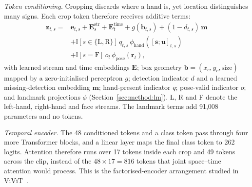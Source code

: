 \documentclass[pdflatex,sn-mathphys-num,twocolumn]{sn-jnl}
\theoremstyle{thmstyleone}%
\begin{document}
\textit{Token conditioning.} Cropping discards where a hand is, yet location distinguishes many signs. Each crop token therefore receives additive terms:
\begin{equation}
\begin{aligned}
\mathbf{z}_{t,s}={}&\mathbf{e}_{t,s}+\mathbf{E}^{\mathrm{str}}_{s}+\mathbf{E}^{\mathrm{time}}_{t}+g(\mathbf{b}_{t,s})+(1-d_{t,s})\,\mathbf{m}\\
&+\mathbb{I}[s\in\{\mathrm{L},\mathrm{R}\}]\,q_{t,s}\,\phi_{\mathrm{hand}}([\mathbf{s};\mathbf{u}]_{t,s})\\
&+\mathbb{I}[s=\mathrm{F}]\,o_t\,\phi_{\mathrm{pose}}(\mathbf{r}_t),
\end{aligned}\label{eq:token}
\end{equation}
with learned stream and time embeddings $\mathbf{E}$; box geometry $\mathbf{b}=(x_c,y_c,\text{size})$ mapped by a zero-initialised perceptron $g$; detection indicator $d$ and a learned missing-detection embedding $\mathbf{m}$; hand-present indicator $q$; pose-valid indicator $o$; and landmark projections $\phi$ (Section~\ref{sec:method:lm}). L, R and F denote the left-hand, right-hand and face streams. The landmark terms add 91,008 parameters and no tokens.

\textit{Temporal encoder.} The 48 conditioned tokens and a class token pass through four more Transformer blocks, and a linear layer maps the final class token to 262 logits. Attention therefore runs over 17 tokens inside each crop and 49 tokens across the clip, instead of the $48\times17=816$ tokens that joint space--time attention would process. This is the factorised-encoder arrangement studied in ViViT~\cite{arnab2021vivit}.
\end{document}
